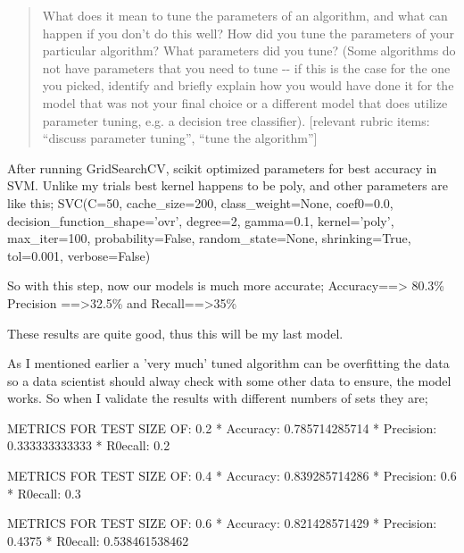 \documentclass[11pt]{article}
\begin{document}
\begin{quote}
What does it mean to tune the parameters of an algorithm, and what can
happen if you don't do this well? How did you tune the parameters of
your particular algorithm? What parameters did you tune? (Some
algorithms do not have parameters that you need to tune -\/- if this is
the case for the one you picked, identify and briefly explain how you
would have done it for the model that was not your final choice or a
different model that does utilize parameter tuning, e.g. a decision tree
classifier). {[}relevant rubric items: ``discuss parameter tuning'',
``tune the algorithm''{]}
\end{quote}

After running GridSearchCV, scikit optimized parameters for best
accuracy in SVM. Unlike my trials best kernel happens to be poly, and
other parameters are like this; SVC(C=50, cache\_size=200,
class\_weight=None, coef0=0.0, decision\_function\_shape='ovr',
degree=2, gamma=0.1, kernel='poly', max\_iter=100, probability=False,
random\_state=None, shrinking=True, tol=0.001, verbose=False)

So with this step, now our models is much more accurate;
Accuracy==\textgreater{} 80.3\% Precision ==\textgreater{}32.5\% and
Recall==\textgreater{}35\%

These results are quite good, thus this will be my last model.

As I mentioned earlier a 'very much' tuned algorithm can be overfitting
the data so a data scientist should alway check with some other data to
ensure, the model works. So when I validate the results with different
numbers of sets they are;

METRICS FOR TEST SIZE OF: 0.2 * Accuracy: 0.785714285714 * Precision:
0.333333333333 * R0ecall: 0.2

METRICS FOR TEST SIZE OF: 0.4 * Accuracy: 0.839285714286 * Precision:
0.6 * R0ecall: 0.3

METRICS FOR TEST SIZE OF: 0.6 * Accuracy: 0.821428571429 * Precision:
0.4375 * R0ecall: 0.538461538462
\end{document}
